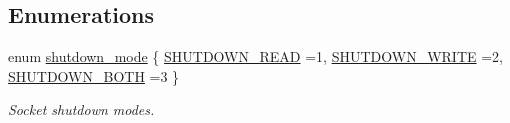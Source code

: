 \subsection*{Enumerations}
\begin{DoxyCompactItemize}
\item 
enum \hyperlink{group__syscalls_ga9eb10a0a72ca3149140272e9344a272b}{shutdown\-\_\-mode} \{ \hyperlink{group__syscalls_gga9eb10a0a72ca3149140272e9344a272bacbd27e0b4e3d4a02b0d833f919887d2d}{S\-H\-U\-T\-D\-O\-W\-N\-\_\-\-R\-E\-A\-D} =1, 
\hyperlink{group__syscalls_gga9eb10a0a72ca3149140272e9344a272ba9a7920b6a1eb57633bb981aa60edbe24}{S\-H\-U\-T\-D\-O\-W\-N\-\_\-\-W\-R\-I\-T\-E} =2, 
\hyperlink{group__syscalls_gga9eb10a0a72ca3149140272e9344a272bab67e72e17566af8eb432d0f3eba6d44d}{S\-H\-U\-T\-D\-O\-W\-N\-\_\-\-B\-O\-T\-H} =3
 \}
\begin{DoxyCompactList}\small\item\em Socket shutdown modes. \end{DoxyCompactList}\end{DoxyCompactItemize}
